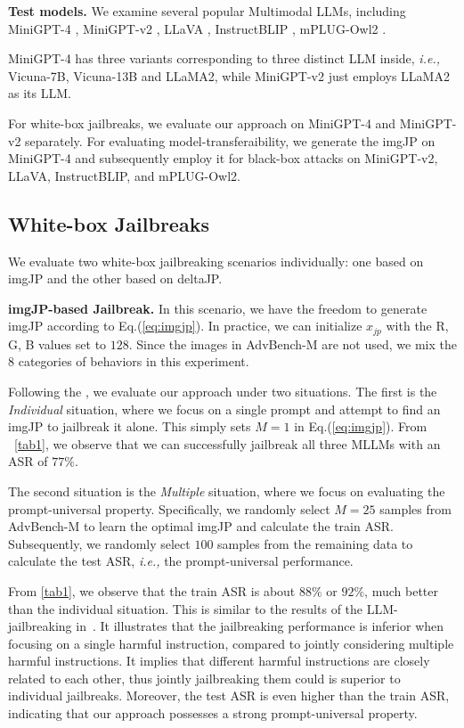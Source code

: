 \noindent\textbf{Test models. }
We examine several popular Multimodal LLMs, including MiniGPT-4 \cite{zhu2023minigpt}, MiniGPT-v2 \cite{chen2023minigpt}, LLaVA \cite{liu2023visual}, InstructBLIP \cite{instructblip}, mPLUG-Owl2 \cite{ye2023mplug}.%

MiniGPT-4 has three variants corresponding to three distinct LLM inside, \emph{i.e.,} Vicuna-7B, Vicuna-13B and LLaMA2, while MiniGPT-v2 just employs LLaMA2 as its LLM. 

For white-box jailbreaks, we evaluate our approach on MiniGPT-4 and MiniGPT-v2 separately. 
For evaluating model-transferaibility, we generate the imgJP on MiniGPT-4 and subsequently employ it for black-box attacks on MiniGPT-v2, LLaVA, InstructBLIP, and mPLUG-Owl2.%

\subsection{White-box Jailbreaks}
We evaluate two white-box jailbreaking scenarios individually: one based on imgJP and the other based on deltaJP.

\noindent\textbf{imgJP-based Jailbreak. } In this scenario, we have the freedom to generate imgJP according to Eq.(\ref{eq:imgjp}). In practice, we can initialize $x_{jp}$ with the R, G, B values set to $128$. Since the images in AdvBench-M are not used, we mix the $8$ categories of behaviors in this experiment. 

Following the \cite{zou2023universal}, we evaluate our approach under two situations. The first is the \emph{Individual} situation, where we focus on a single prompt and attempt to find an imgJP to jailbreak it alone. This simply sets $M=1$ in Eq.(\ref{eq:imgjp}). From ~\cref{tab1}, we observe that we can successfully jailbreak all three MLLMs with an ASR of $77\%$. 

The second situation is the \emph{Multiple} situation, where we focus on evaluating the prompt-universal property. Specifically, we randomly select $M=25$ samples from AdvBench-M to learn the optimal imgJP and calculate the train ASR. Subsequently, we randomly select $100$ samples from the remaining data to calculate the test ASR, \emph{i.e.,} the prompt-universal performance.

From \cref{tab1}, we observe that the train ASR is about $88\%$ or $92\%$, much better than the individual situation. This is similar to the results of the LLM-jailbreaking in~\cite{zou2023universal}. It illustrates that the jailbreaking performance is inferior when focusing on a single harmful instruction, compared to jointly considering multiple harmful instructions. It implies that different harmful instructions are closely related to each other, thus jointly jailbreaking them could is superior to individual jailbreaks. Moreover, the test ASR is even higher than the train ASR, indicating that our approach possesses a strong prompt-universal property. 

